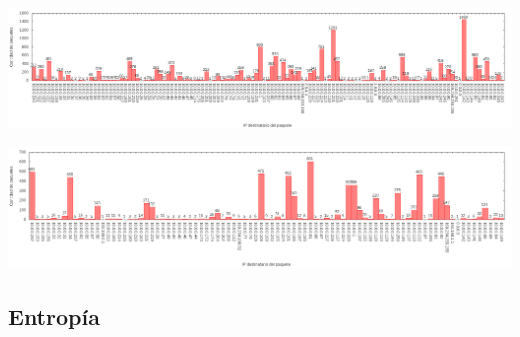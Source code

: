 \begin{center}
\includegraphics[width=16cm]{../mediciones/job1/dst.png}
\end{center}

\begin{center}
\includegraphics[width=16cm]{../mediciones/job2/dst.png}
\end{center}

\subsection{Entropía}

